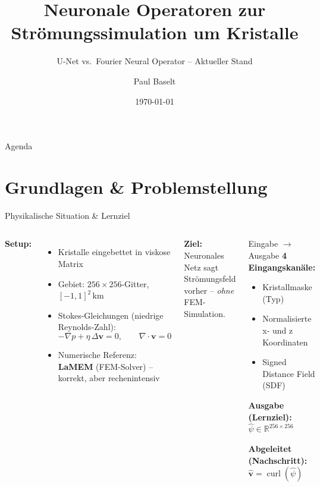 \documentclass[aspectratio=169]{beamer}
\title[Neuronale Operatoren]{Neuronale Operatoren zur\\
       Strömungssimulation um Kristalle}
\subtitle{U-Net vs.\ Fourier Neural Operator -- Aktueller Stand}
\author{Paul Baselt}
\date{\today}
\institute{Betreuer-Meeting -- Masterarbeit}
\begin{document}

\begin{frame}
  \titlepage
\end{frame}

\begin{frame}{Agenda}
  \tableofcontents
\end{frame}

\section{Grundlagen \& Problemstellung}

\begin{frame}{Physikalische Situation \& Lernziel}
  \begin{columns}[T]
      \textbf{Setup:}
      \begin{itemize}
        \item Kristalle eingebettet in viskose Matrix
        \item Gebiet: $256\times256$-Gitter, $[-1,1]^2$\,km
        \item Stokes-Gleichungen (niedrige Reynolds-Zahl):
          \[
            -\nabla p + \eta\,\Delta\mathbf{v} = 0, \qquad \nabla\cdot\mathbf{v}=0
          \]
        \item Numerische Referenz: \textbf{LaMEM} (FEM-Solver) -- korrekt, aber rechenintensiv
      \end{itemize}
      \vspace{8pt}
      \textbf{Ziel:} Neuronales Netz sagt Strömungsfeld vorher -- \emph{ohne} FEM-Simulation.

      \begin{block}{Eingabe $\to$ Ausgabe}
        \textbf{4 Eingangskanäle:}
        \begin{itemize}
          \item Kristallmaske (Typ)
          \item Normalisierte x- und z Koordinaten 
          \item Signed Distance Field (SDF)
        \end{itemize}
        \vspace{6pt}
        \textbf{Ausgabe (Lernziel):}\\[4pt]
        $\hat\psi \in \mathbb{R}^{256\times256}$
        \vspace{6pt}

        \textbf{Abgeleitet (Nachschritt):}\\[4pt]
        $\hat{\mathbf{v}} = \operatorname{curl}(\hat\psi)$
      \end{block}
  \end{columns}
\end{frame}
\end{document}
